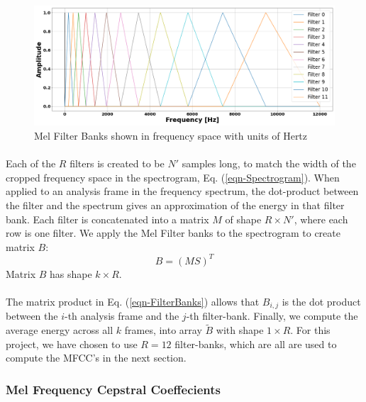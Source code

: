 \documentclass[12pt,letterpaper]{article}
\begin{document}
\begin{figure}[H]
\begin{center}
\includegraphics[scale=0.28]{../FiguresSpectrogram/MelFilterBanks}
\end{center}
\caption{Mel Filter Banks shown in frequency space with units of Hertz}
\label{fig-MelFilterBanks}
\end{figure}


\paragraph*{}Each of the $R$ filters is created to be $N'$ samples long, to match the width of the cropped frequency space in the spectrogram, Eq. (\ref{eqn-Spectrogram}). When applied to an analysis frame in the frequency spectrum, the dot-product between the filter and the spectrum gives an approximation of the energy in that filter bank. Each filter is concatenated into a matrix $M$ of shape $R \times N'$, where each row is one filter. We apply the Mel Filter banks to the spectrogram to create matrix $B$:
\begin{equation}
\label{eqn-FilterBanks}
B = (MS)^T
\end{equation}
Matrix $B$ has shape $k \times R$.

\paragraph*{}The matrix product in Eq. (\ref{eqn-FilterBanks}) allows that $B_{i,j}$ is the dot product between the $i$-th analysis frame and the $j$-th filter-bank. Finally, we compute the average energy across all $k$ frames, into array $\widetilde{B}$ with shape $1 \times R$. For this project, we have chosen to use $R = 12$ filter-banks, which are all are used to compute the MFCC's in the next section.


\subsubsection{Mel Frequency Cepstral Coeffecients}
\end{document}
